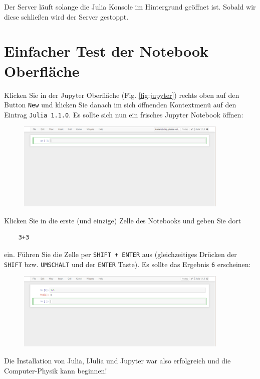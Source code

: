 \documentclass[11pt, a4paper]{scrartcl}
\begin{document}
	Der Server läuft solange die Julia Konsole im Hintergrund geöffnet ist. Sobald wir diese schließen wird der Server gestoppt.
	
	
	
	
	
	
	
	
	
	
	
	
	
	\newpage
	\section{Einfacher Test der Notebook Oberfläche}
	
	Klicken Sie in der Jupyter Oberfläche (Fig. \ref{fig:jupyter}) rechts oben auf den Button \texttt{New} und klicken Sie danach im sich öffnenden Kontextmenü auf den Eintrag \texttt{Julia 1.1.0}. Es sollte sich nun ein frisches Jupyter Notebook öffnen:
	
	\begin{figure}[h!]
	\centering
	\includegraphics[width=0.9\textwidth]{imgs/jupyter_notebook.png}
	\end{figure}

	Klicken Sie in die erste (und einzige) Zelle des Notebooks und geben Sie dort
	
	\begin{lstlisting}
	3+3
	\end{lstlisting}
	ein. Führen Sie die Zelle per \texttt{SHIFT + ENTER} aus (gleichzeitiges Drücken der \texttt{SHIFT} bzw. \texttt{UMSCHALT} und der \texttt{ENTER} Taste). Es sollte das Ergebnis \texttt{6} erscheinen:

	\begin{figure}[h!]
	\centering
	\includegraphics[width=0.9\textwidth]{imgs/jupyter_notebook_test.png}
	\end{figure}	

	Die Installation von Julia, IJulia und Jupyter war also erfolgreich und die Computer-Physik kann beginnen!
	
\end{document}
